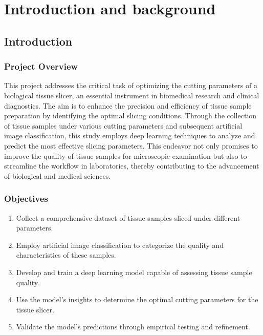 \section{Introduction and background}
\label{sec:introduction}


\subsection{Introduction}

\subsubsection{Project Overview}

This project addresses the critical task of optimizing the cutting parameters of a biological tissue slicer, an essential instrument in biomedical research and clinical diagnostics. The aim is to enhance the precision and efficiency of tissue sample preparation by identifying the optimal slicing conditions. Through the collection of tissue samples under various cutting parameters and subsequent artificial image classification, this study employs deep learning techniques to analyze and predict the most effective slicing parameters. This endeavor not only promises to improve the quality of tissue samples for microscopic examination but also to streamline the workflow in laboratories, thereby contributing to the advancement of biological and medical sciences.
\subsubsection{Objectives}

\begin{enumerate}
    \item Collect a comprehensive dataset of tissue samples sliced under different parameters.
    \item Employ artificial image classification to categorize the quality and characteristics of these samples.
    \item Develop and train a deep learning model capable of assessing tissue sample quality.
    \item Use the model's insights to determine the optimal cutting parameters for the tissue slicer.
    \item Validate the model's predictions through empirical testing and refinement.
\end{enumerate}

